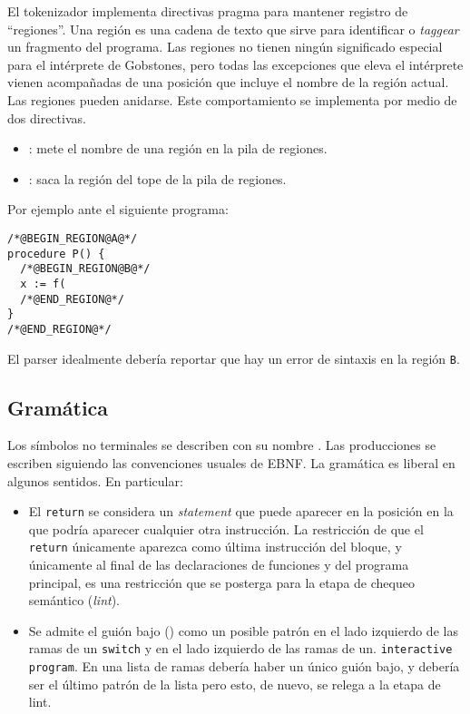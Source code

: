 \documentclass{article}
\begin{document}
El tokenizador implementa directivas pragma para
mantener registro de ``regiones''. Una regi\'on es una cadena de texto que
sirve para identificar o {\em taggear} un fragmento del programa.
Las regiones no tienen ning\'un significado
especial para el int\'erprete de Gobstones, pero todas las excepciones que
eleva el int\'erprete vienen acompa\~nadas de una posici\'on que incluye
el nombre de la regi\'on actual. Las regiones pueden anidarse.
Este comportamiento se implementa por medio de dos directivas.
\begin{itemize}
\item {}:
       mete el nombre de una regi\'on en la pila de regiones.
\item {}: saca la regi\'on del tope de la pila de regiones.
\end{itemize}
Por ejemplo ante el siguiente programa:
\begin{verbatim}
/*@BEGIN_REGION@A@*/
procedure P() {
  /*@BEGIN_REGION@B@*/
  x := f(
  /*@END_REGION@*/
}
/*@END_REGION@*/
\end{verbatim}
El parser idealmente deber\'ia reportar que hay un error de sintaxis en la regi\'on \texttt{B}.

\subsection{Gram\'atica}
Los s\'imbolos no terminales se describen con su nombre .
Las producciones se escriben siguiendo las convenciones usuales de EBNF.
La gram\'atica es liberal en algunos sentidos. En particular:
\begin{itemize}
\item El \texttt{return}
se considera un {\em statement} que puede aparecer en la posici\'on en la que
podr\'ia aparecer cualquier otra instrucci\'on. La restricci\'on de que
el \texttt{return} \'unicamente aparezca como \'ultima instrucci\'on del bloque, y
\'unicamente al final de las declaraciones de funciones y del programa principal,
es una restricci\'on que se posterga para la etapa de chequeo sem\'antico
({\em lint}).
\item Se admite el gui\'on bajo (\chr{\_}) como un posible patr\'on en el lado
izquierdo de las ramas de un \texttt{switch} y en el lado izquierdo de las ramas de un.
\texttt{interactive program}.
En una lista de ramas deber\'ia haber un \'unico gui\'on bajo, y deber\'ia ser el \'ultimo
patr\'on de la lista pero esto, de nuevo, se relega a la etapa de lint.
\end{itemize}
\end{document}
